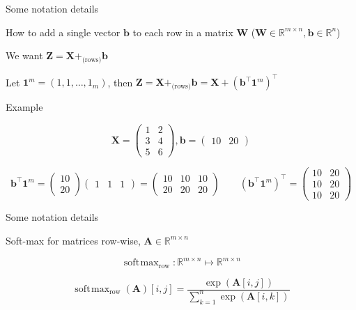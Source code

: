 \documentclass[12pt,aspectratio=169,handout]{beamer}
\DeclareMathOperator*{\softmax}{soft\!\max}
\begin{document}
\begin{frame}{Some notation details}
	
	How to add a single vector $\bm{b}$ to each row in a matrix $\bm{W}$ ($\bm{W} \in \mathbb{R}^{m \times n}, \bm{b} \in \mathbb{R}^{n}$)
	
	We want $\bm{Z} = \bm{X} +_{\text{(rows)}} \bm{b}$
	
	Let $\bm{1}^{m} = (1, 1, \ldots, 1_m)$, then $\bm{Z} = \bm{X} +_{\text{(rows)}} \bm{b} = \bm{X} +  (\bm{b}^\top  \bm{1}^{m})^\top$
	
	\begin{block}{Example}
		\begin{scriptsize}
			$$
			\bm{X} =
			\begin{pmatrix}
				1 & 2 \\
				3 & 4 \\
				5 & 6
			\end{pmatrix}
			,
			\bm{b} = \begin{pmatrix}10 & 20\end{pmatrix}
			$$
			
			$$
			\bm{b}^\top \bm{1}^m = \begin{pmatrix}10 \\ 20\end{pmatrix}
			\begin{pmatrix}1 & 1 & 1\end{pmatrix} =
			\begin{pmatrix}10 & 10 & 10 \\ 20 & 20 & 20 \end{pmatrix}
			\qquad
			(\bm{b}^\top \bm{1}^m)^\top = 
			\begin{pmatrix} 10 & 20 \\ 10 & 20 \\ 10 & 20 \end{pmatrix}
			$$
		\end{scriptsize}
	\end{block}
	
	
\end{frame}








\begin{frame}{Some notation details}
	
	Soft-max for matrices row-wise, $\bm{A} \in \mathbb{R}^{m \times n}$
	
	$$
	\softmax_{\text{row}} : \mathbb{R}^{m \times n} \mapsto \mathbb{R}^{m \times n}
	$$
	
	$$
	\softmax_{\text{row}} (\bm{A}) [i, j] = \frac{
		\exp( \bm{A}[i, j])
	}{
		\sum_{k = 1}^n \exp (\bm{A}[i, k])
	}
	$$
	
	
\end{frame}
\end{document}
